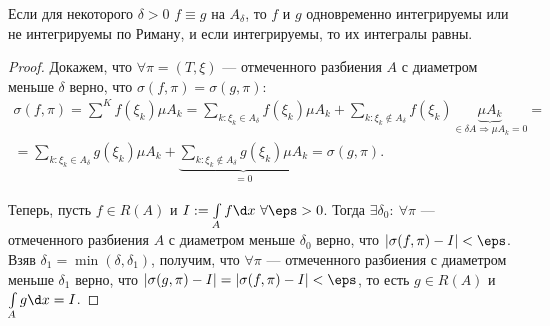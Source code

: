 \begin{Statement}
Если для некоторого $\delta > 0$ $f \equiv g$ на $A_\delta$, то $f$ и $g$ одновременно интегрируемы или не интегрируемы по Риману, и если интегрируемы, то их интегралы равны.
\end{Statement}
\begin{proof}
Докажем, что $\forall \pi = (T, \xi)$ --- отмеченного разбиения $A$ с диаметром меньше $\delta$ верно, что $\sigma(f, \pi) = \sigma(g, \pi)$:
\begin{gather*}
\sigma(f, \pi) = \sum\limits^Kf(\xi_k)\mu A_k = \sum\limits_{k: \xi_k \in A_\delta} f(\xi_k)\mu A_k + \sum\limits_{k: \xi_k \not\in A_\delta}f(\xi_k) \underbrace{\mu A_k}_{\in \delta A \Rightarrow \mu A_k = 0} = \\= \sum\limits_{k: \xi_k \in A_\delta} g(\xi_k)\mu A_k + \underbrace{\sum\limits_{k: \xi_k \not\in A_\delta}g(\xi_k) \mu A_k}_{= 0} = \sigma(g, \pi).
\end{gather*}

Теперь, пусть $f \in R(A)$ и $I := \int\limits_A f \d x\ \forall \eps > 0$. Тогда $\exists \delta_0:\ \forall \pi$ --- отмеченного разбиения $A$ с диаметром меньше $\delta_0$ верно, что $|\sigma(f, \pi) - I| < \eps$. Взяв $\delta_1 = \min(\delta, \delta_1)$, получим, что $\forall \pi$ --- отмеченного разбиения с диаметром меньше $\delta_1$ верно, что $| \sigma(g, \pi) - I | = |\sigma(f, \pi) - I| < \eps$, то есть $g \in R(A)$ и $\int\limits_A g \d x = I$.

\end{proof}
